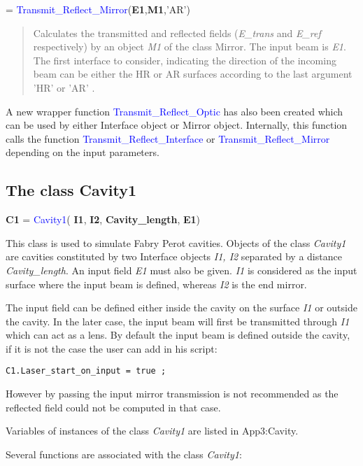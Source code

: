 = \textcolor{blue}{Transmit\_Reflect\_Mirror}(\textbf{E1},\textbf{M1},'AR')
\vspace*{-0.2cm}
\begin{quote}
Calculates the transmitted and reflected fields (\textsl{E\_trans} and \textsl{E\_ref} respectively) by an object \textsl{M1} of the class Mirror. The input beam is \textsl{E1}. The first interface to consider, indicating the direction of the incoming beam can be either the HR or AR surfaces according to the last argument 'HR' or 'AR' .
\end{quote}

A new wrapper function \textcolor{blue}{Transmit\_Reflect\_Optic} has also been created which can be used by either Interface object or Mirror object. Internally, this function calls the function \textcolor{blue}{Transmit\_Reflect\_Interface} or \textcolor{blue}{Transmit\_Reflect\_Mirror} depending on the input parameters.

\subsection{The class Cavity1}
\textbf{C1} = \textcolor{blue}{Cavity1}( \textbf{I1}, \textbf{I2}, \textbf{Cavity\_length}, \textbf{E1})

This class is used to simulate Fabry Perot cavities. Objects of the class \textsl{Cavity1} are cavities constituted by two Interface objects \textsl{I1, I2} separated by a distance \textsl{Cavity\_length}. An input field \textsl{E1} must also be given. \textsl{I1} is considered as the input surface where the input beam is defined, whereas \textsl{I2} is the end mirror.

The input field can be defined either inside the cavity on the surface \textsl{I1} or outside the cavity. In the later case, the input beam will first be transmitted through \textsl{I1} which can act as a lens. By default the input beam is defined outside the cavity, if it is not the case the user can add in his script:
\begin{verbatim}
C1.Laser_start_on_input = true ;
\end{verbatim}
However by passing the input mirror transmission is not recommended as the reflected field could not be computed in that case.


Variables of instances of the class \textsl{Cavity1} are listed in {App3:Cavity}.

\noindent Several functions are associated with the class \textsl{Cavity1}:

